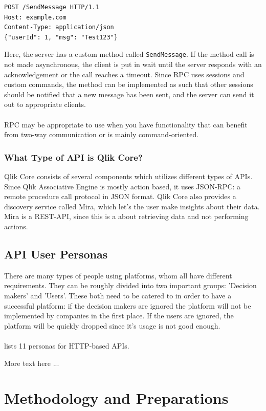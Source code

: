 \documentclass{article}
\begin{document}
\begin{lstlisting}
POST /SendMessage HTTP/1.1
Host: example.com
Content-Type: application/json
{"userId": 1, "msg": "Test123"}
\end{lstlisting}

Here, the server has a custom method called \texttt{SendMessage}. If the
method call is not made asynchronous, the client is put in wait until
the server responds with an acknowledgement or the call reaches a
timeout. Since RPC uses sessions and custom commands, the method can be
implemented as such that other sessions should be notified that a new
message has been sent, and the server can send it out to appropriate
clients.
\\ \\
RPC may be appropriate to use when you have functionality that can
benefit from two-way communication or is mainly command-oriented.

\subsubsection{What Type of API is Qlik Core?}

Qlik Core consists of several components which utilizes different types
of APIs. Since Qlik Associative Engine is mostly action based, it uses
JSON-RPC: a remote procedure call protocol in JSON format. Qlik Core
also provides a discovery service called Mira, which let's the user make
insights about their data. Mira is a REST-API, since this is a about
retrieving data and not performing actions.\cite{qlikwebsite}

\subsection{API User Personas}
There are many types of people using platforms, whom all have different
requirements. They can be roughly divided into two important groups:
'Decision makers' and 'Users'. These both need to be catered to in order
to have a successful platform: if the decision makers are ignored the
platform will not be implemented by companies in the first place. If the
users are ignored, the platform will be quickly dropped since it's usage
is not good enough.
\\ \\
\cite{personas} lists 11 personas for HTTP-based APIs.

More text here ...


\section{Methodology and Preparations}
\end{document}
